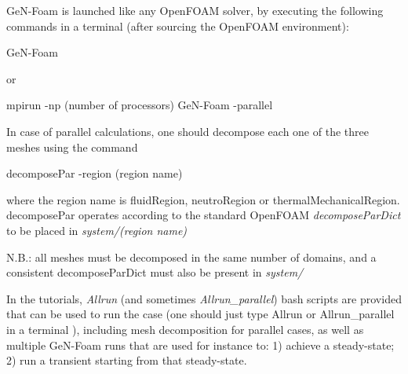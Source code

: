 Ge\+N-\/\+Foam is launched like any Open\+F\+O\+AM solver, by executing the following commands in a terminal (after sourcing the Open\+F\+O\+AM environment)\+:

{\ttfamily Ge\+N-\/\+Foam}

or

{\ttfamily mpirun -\/np (number of processors) Ge\+N-\/\+Foam -\/parallel}

In case of parallel calculations, one should decompose each one of the three meshes using the command

{\ttfamily decompose\+Par -\/region (region name)}

where the region name is fluid\+Region, neutro\+Region or thermal\+Mechanical\+Region. {\ttfamily decompose\+Par} operates according to the standard Open\+F\+O\+AM {\itshape decompose\+Par\+Dict} to be placed in {\itshape system/(region name)}

N.\+B.\+: all meshes must be decomposed in the same number of domains, and a consistent decompose\+Par\+Dict must also be present in {\itshape system/}

In the tutorials, {\itshape Allrun} (and sometimes {\itshape Allrun\+\_\+parallel}) bash scripts are provided that can be used to run the case (one should just type {\ttfamily Allrun} or {\ttfamily Allrun\+\_\+parallel} in a terminal ), including mesh decomposition for parallel cases, as well as multiple Ge\+N-\/\+Foam runs that are used for instance to\+: 1) achieve a steady-\/state; 2) run a transient starting from that steady-\/state. 